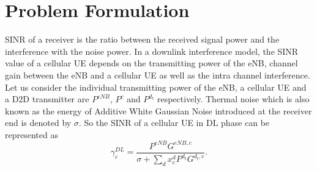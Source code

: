 \documentclass[times]{dacauth}
\begin{document}
	
	







\section{Problem Formulation}\label{section:Problem Formulation}
\noindent
SINR of a receiver is the ratio between the received signal power and the interference with the noise power. In a downlink interference model, the SINR value of a cellular UE depends on the transmitting power of the eNB, channel gain between the eNB and a cellular UE as well as the intra channel interference. Let us consider the individual transmitting power of the eNB, a cellular UE and a D2D transmitter are $P^{eNB}$, $P^{c}$ and $P^{d_t}$ respectively. Thermal noise which is also known as the energy of Additive White Gaussian Noise introduced at the receiver end is denoted by $\sigma$. So the SINR of a cellular UE in DL phase \cite{zulhasnine} can be represented as
 \begin{equation}\label{eqn:sinr_c}
 \gamma_{c}^{DL} = \frac{P^{eNB}G^{eNB,c}}{\sigma + \sum_{d} x_{c}^{d}P^{d_t}G^{d_{t},c}}.
 \end{equation}
 
\end{document}
